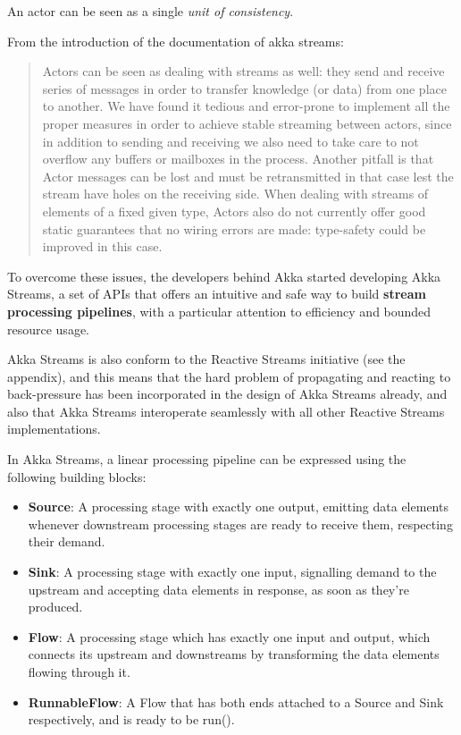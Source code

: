 An actor can be seen as a single \emph{unit of consistency}.

From the introduction of the documentation of akka streams:

\begin{quote}
Actors can be seen as dealing with streams as well: they send and
receive series of messages in order to transfer knowledge (or data) from
one place to another. We have found it tedious and error-prone to
implement all the proper measures in order to achieve stable streaming
between actors, since in addition to sending and receiving we also need
to take care to not overflow any buffers or mailboxes in the process.
Another pitfall is that Actor messages can be lost and must be
retransmitted in that case lest the stream have holes on the receiving
side. When dealing with streams of elements of a fixed given type,
Actors also do not currently offer good static guarantees that no wiring
errors are made: type-safety could be improved in this case.
\end{quote}

To overcome these issues, the developers behind Akka started developing
Akka Streams, a set of APIs that offers an intuitive and safe way to
build \textbf{stream processing pipelines}, with a particular attention
to efficiency and bounded resource usage.

Akka Streams is also conform to the Reactive Streams initiative (see the
appendix), and this means that the hard problem of propagating and
reacting to back-pressure has been incorporated in the design of Akka
Streams already, and also that Akka Streams interoperate seamlessly with
all other Reactive Streams implementations.

In Akka Streams, a linear processing pipeline can be expressed using the
following building blocks:

\begin{itemize}
\itemsep1pt\parskip0pt
\item
  \textbf{Source}: A processing stage with exactly one output, emitting
  data elements whenever downstream processing stages are ready to
  receive them, respecting their demand.
\item
  \textbf{Sink}: A processing stage with exactly one input, signalling
  demand to the upstream and accepting data elements in response, as
  soon as they're produced.
\item
  \textbf{Flow}: A processing stage which has exactly one input and
  output, which connects its upstream and downstreams by transforming
  the data elements flowing through it.
\item
  \textbf{RunnableFlow}: A Flow that has both ends attached to a Source
  and Sink respectively, and is ready to be run().
\end{itemize}

